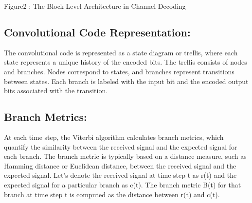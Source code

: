 \documentclass[10pt, onecolumn]{article}
\begin{document}

\begin{center}
Figure2 : The Block Level Architecture in Channel Decoding
\end{center}

\subsection{Convolutional Code Representation:}

The convolutional code is represented as a state diagram or trellis, where each state represents a unique history of the encoded bits.
The trellis consists of nodes and branches. Nodes correspond to states, and branches represent transitions between states.
Each branch is labeled with the input bit and the encoded output bits associated with the transition.

\subsection{Branch Metrics:}
At each time step, the Viterbi algorithm calculates branch metrics, which quantify the similarity between the received signal and the expected signal for each branch.
The branch metric is typically based on a distance measure, such as Hamming distance or Euclidean distance, between the received signal and the expected signal.
Let's denote the received signal at time step t as r(t) and the expected signal for a particular branch as c(t). The branch metric B(t) for that branch at time step t is computed as the distance between r(t) and c(t).
\end{document}

